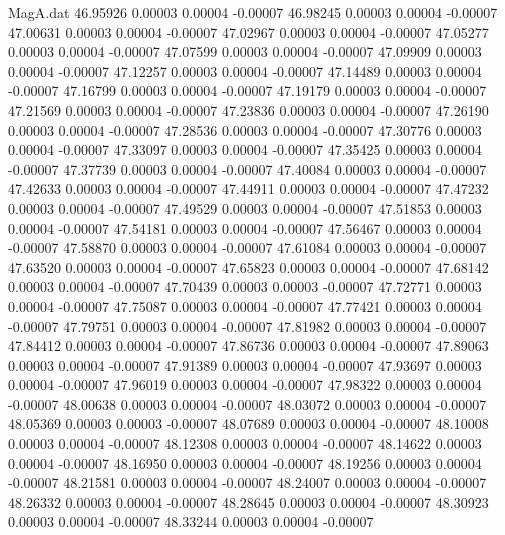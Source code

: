 \begin{filecontents}{MagA.dat}
  46.95926    0.00003    0.00004   -0.00007
  46.98245    0.00003    0.00004   -0.00007
  47.00631    0.00003    0.00004   -0.00007
  47.02967    0.00003    0.00004   -0.00007
  47.05277    0.00003    0.00004   -0.00007
  47.07599    0.00003    0.00004   -0.00007
  47.09909    0.00003    0.00004   -0.00007
  47.12257    0.00003    0.00004   -0.00007
  47.14489    0.00003    0.00004   -0.00007
  47.16799    0.00003    0.00004   -0.00007
  47.19179    0.00003    0.00004   -0.00007
  47.21569    0.00003    0.00004   -0.00007
  47.23836    0.00003    0.00004   -0.00007
  47.26190    0.00003    0.00004   -0.00007
  47.28536    0.00003    0.00004   -0.00007
  47.30776    0.00003    0.00004   -0.00007
  47.33097    0.00003    0.00004   -0.00007
  47.35425    0.00003    0.00004   -0.00007
  47.37739    0.00003    0.00004   -0.00007
  47.40084    0.00003    0.00004   -0.00007
  47.42633    0.00003    0.00004   -0.00007
  47.44911    0.00003    0.00004   -0.00007
  47.47232    0.00003    0.00004   -0.00007
  47.49529    0.00003    0.00004   -0.00007
  47.51853    0.00003    0.00004   -0.00007
  47.54181    0.00003    0.00004   -0.00007
  47.56467    0.00003    0.00004   -0.00007
  47.58870    0.00003    0.00004   -0.00007
  47.61084    0.00003    0.00004   -0.00007
  47.63520    0.00003    0.00004   -0.00007
  47.65823    0.00003    0.00004   -0.00007
  47.68142    0.00003    0.00004   -0.00007
  47.70439    0.00003    0.00003   -0.00007
  47.72771    0.00003    0.00004   -0.00007
  47.75087    0.00003    0.00004   -0.00007
  47.77421    0.00003    0.00004   -0.00007
  47.79751    0.00003    0.00004   -0.00007
  47.81982    0.00003    0.00004   -0.00007
  47.84412    0.00003    0.00004   -0.00007
  47.86736    0.00003    0.00004   -0.00007
  47.89063    0.00003    0.00004   -0.00007
  47.91389    0.00003    0.00004   -0.00007
  47.93697    0.00003    0.00004   -0.00007
  47.96019    0.00003    0.00004   -0.00007
  47.98322    0.00003    0.00004   -0.00007
  48.00638    0.00003    0.00004   -0.00007
  48.03072    0.00003    0.00004   -0.00007
  48.05369    0.00003    0.00003   -0.00007
  48.07689    0.00003    0.00004   -0.00007
  48.10008    0.00003    0.00004   -0.00007
  48.12308    0.00003    0.00004   -0.00007
  48.14622    0.00003    0.00004   -0.00007
  48.16950    0.00003    0.00004   -0.00007
  48.19256    0.00003    0.00004   -0.00007
  48.21581    0.00003    0.00004   -0.00007
  48.24007    0.00003    0.00004   -0.00007
  48.26332    0.00003    0.00004   -0.00007
  48.28645    0.00003    0.00004   -0.00007
  48.30923    0.00003    0.00004   -0.00007
  48.33244    0.00003    0.00004   -0.00007

\end{filecontents}
